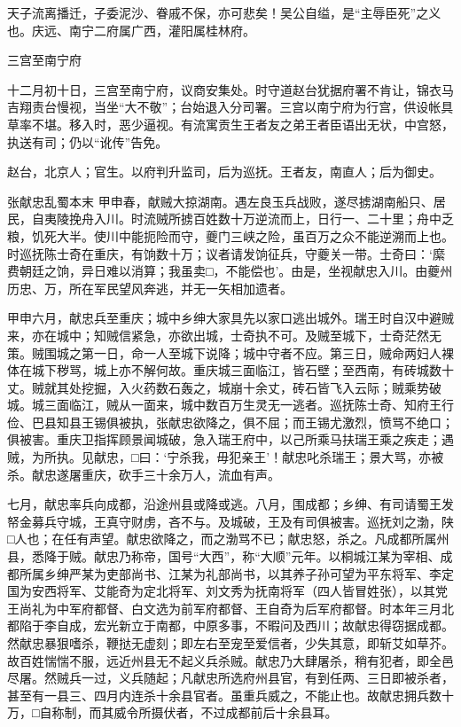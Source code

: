 \documentclass[]{article}
\begin{document}
天子流离播迁，子委泥沙、眷戚不保，亦可悲矣！吴公自缢，是``主辱臣死''之义也。庆远、南宁二府属广西，灌阳属桂林府。

三宫至南宁府

十二月初十日，三宫至南宁府，议商安集处。时守道赵台犹据府署不肯让，锦衣马吉翔责台慢视，当坐``大不敬''；台始退入分司署。三宫以南宁府为行宫，供设帐具草率不堪。移入时，恶少逼视。有流寓贡生王者友之弟王者臣语出无状，中宫怒，执送有司；仍以``讹传''告免。

赵台，北京人；官生。以府判升监司，后为巡抚。王者友，南直人；后为御史。

张献忠乱蜀本末
甲申春，献贼大掠湖南。遇左良玉兵战败，遂尽掳湖南船只、居民，自夷陵挽舟入川。时流贼所掳百姓数十万逆流而上，日行一、二十里；舟中乏粮，饥死大半。使川中能扼险而守，夔门三峡之险，虽百万之众不能逆溯而上也。时巡抚陈士奇在重庆，有饷数十万；议者请发饷征兵，守夔关一带。士奇曰：`縻费朝廷之饷，异日难以消算；我虽卖□，不能偿也'。由是，坐视献忠入川。由夔州历忠、万，所在军民望风奔逃，并无一矢相加遗者。

甲申六月，献忠兵至重庆；城中乡绅大家具先以家口逃出城外。瑞王时自汉中避贼来，亦在城中；知贼信紧急，亦欲出城，士奇执不可。及贼至城下，士奇茫然无策。贼围城之第一日，命一人至城下说降；城中守者不应。第三日，贼命两妇人裸体在城下秽骂，城上亦不解何故。重庆城三面临江，皆石壁；至西南，有砖城数十丈。贼就其处挖掘，入火药数石轰之，城崩十余丈，砖石皆飞入云际；贼乘势破城。城三面临江，贼从一面来，城中数百万生灵无一逃者。巡抚陈士奇、知府王行俭、巴县知县王锡俱被执，张献忠欲降之，俱不屈；而王锡尤激烈，愤骂不绝口；俱被害。重庆卫指挥顾景闻城破，急入瑞王府中，以己所乘马扶瑞王乘之疾走；遇贼，为所执。见献忠，□曰：`宁杀我，毋犯亲王'！献忠叱杀瑞王；景大骂，亦被杀。献忠遂屠重庆，砍手三十余万人，流血有声。

七月，献忠率兵向成都，沿途州县或降或逃。八月，围成都；乡绅、有司请蜀王发帑金募兵守城，王真守财虏，吝不与。及城破，王及有司俱被害。巡抚刘之渤，陕□人也；在任有声望。献忠欲降之，而之渤骂不已；献忠怒，杀之。凡成都所属州县，悉降于贼。献忠乃称帝，国号``大西''，称``大顺''元年。以桐城江某为宰相、成都所属乡绅严某为吏部尚书、江某为礼部尚书，以其养子孙可望为平东将军、李定国为安西将军、艾能奇为定北将军、刘文秀为抚南将军（四人皆冒姓张），以其党王尚礼为中军府都督、白文选为前军府都督、王自奇为后军府都督。时本年三月北都陷于李自成，宏光新立于南都，中原多事，不暇问及西川；故献忠得窃据成都。然献忠暴狠嗜杀，鞭挞无虚刻；即左右至宠至爱信者，少失其意，即斩艾如草芥。故百姓惴惴不服，远近州县无不起义兵杀贼。献忠乃大肆屠杀，稍有犯者，即全邑尽屠。然贼兵一过，义兵随起；凡献忠所选府州县官，有到任两、三日即被杀者，甚至有一县三、四月内连杀十余县官者。虽重兵威之，不能止也。故献忠拥兵数十万，□自称制，而其威令所摄伏者，不过成都前后十余县耳。
\end{document}

